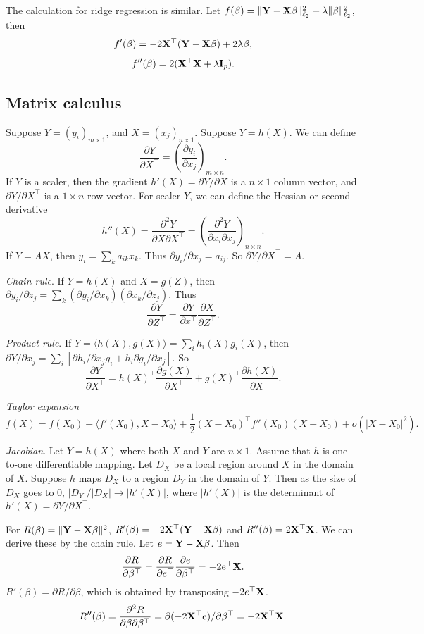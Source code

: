 \documentclass{article}\usepackage[]{graphicx}\usepackage[]{color}
\def\T{{\top}}
\def\X{{\bf X}}
\def\Y{{\bf Y}}
\def\I{{\bf I}}
\begin{document}
The calculation for ridge regression is similar. Let $f(\beta) = \|\Y  - \X\beta\|_{\ell_2}^2 + \lambda \|\beta\|_{\ell_2}^2$, then 
\[
f'(\beta) = -2 \X^\T(\Y-\X\beta) + 2 \lambda \beta,
\]  
\[
f''(\beta)  = 2 (\X^\T \X + \lambda \I_p). 
\]

\subsection{Matrix calculus} 

Suppose $Y = (y_i)_{m \times 1}$, and $X = (x_j)_{n \times 1}$. Suppose $Y = h(X)$.  We can define 
\[
\frac{\partial Y}{\partial X^\T} = \left(\frac{\partial y_i}{\partial x_j}\right)_{m\times n}.
\]
 If $Y$ is a scaler, then the gradient $h'(X) = \partial Y/\partial X$ is a $n\times 1$ column vector, and $\partial Y/\partial X^\T$ is a $1 \times n$ row vector. For scaler $Y$, we can define the Hessian or second derivative 
 \[
h''(X) = \frac{ \partial^2Y}{\partial X \partial X^\T} = \left(\frac{\partial^2 Y}{\partial x_i \partial x_j}\right)_{n \times n}.
 \] 
If $Y = AX$, then $y_i = \sum_{k} a_{ik} x_k$. Thus $\partial y_i/\partial x_j = a_{ij}$. So $\partial Y / \partial X^\T = A$. 

{\em Chain rule}. If $Y = h(X)$ and $X = g(Z)$, then $\partial y_i/\partial z_j = \sum_k (\partial y_i/\partial x_k)(\partial x_k/\partial z_j)$. Thus 
\[
\frac{\partial Y}{ \partial Z^\T} = \frac{\partial Y}{ \partial x^\T}\frac{\partial X}{ \partial Z^\T}.
\]

{\em Product rule}. If $Y = \langle h(X), g(X)\rangle = \sum_i h_i(X) g_i(X)$, then $\partial Y/\partial x_j = \sum_i [\partial h_i/\partial x_j g_i + h_i  \partial g_i/\partial x_j] $. So 
\[
\frac{\partial Y}{\partial X^\T} = h(X)^\T \frac{\partial g(X)}{\partial X^\T} + g(X)^\T \frac{\partial h(X)}{\partial X^\T}.
\] 

{\em Taylor expansion}
\[
f(X) = f(X_0) + \langle f'(X_0), X-X_0\rangle + \frac{1}{2} (X-X_0)^\T f''(X_0) (X-X_0) + o(|X-X_0|^2).
\] 
	
{\em Jacobian}. Let $Y = h(X)$ where both $X$ and $Y$ are $n \times 1$. Assume that $h$ is one-to-one differentiable mapping.  Let $D_X$ be a local region around $X$ in the domain of $X$. Suppose $h$ maps $D_X$ to a region $D_Y$ in the domain of $Y$. Then as the size of $D_X$ goes to 0, $|D_Y|/|D_X| \rightarrow |h'(X)|$, where $|h'(X)|$ is the determinant of $h'(X) = \partial Y/\partial X^\T$. 


For $R(\beta) = \|\Y - \X\beta\|^2$, $R'(\beta) = - 2 \X^{\T} (\Y - \X\beta)$ and $R''(\beta) = 2 \X^\T \X$. We can derive these by the chain rule. Let $e = \Y - \X \beta$. Then 
\[
   \frac{\partial R}{\partial \beta^\T} = \frac{\partial R}{\partial e^\T} \frac{\partial e}{\partial \beta^\T} = -2 e^\T \X. 
\]
$R'(\beta) = \partial R/\partial \beta$, which is obtained by transposing $-2 e^\T \X$.  
\[
R''(\beta) =\frac{ \partial^2 R}{\partial \beta \partial \beta^\T} = \partial (-2 \X^\T e)/\partial \beta^\T = -  2 \X^\T \X. 
\]
\end{document}
